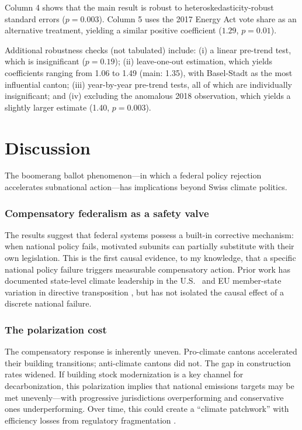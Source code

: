 \documentclass[12pt]{article}
\begin{document}
Column 4 shows that the main result is robust to heteroskedasticity-robust standard errors ($p = 0.003$). Column 5 uses the 2017 Energy Act vote share as an alternative treatment, yielding a similar positive coefficient ($1.29$, $p = 0.01$).

Additional robustness checks (not tabulated) include: (i) a linear pre-trend test, which is insignificant ($p = 0.19$); (ii) leave-one-out estimation, which yields coefficients ranging from 1.06 to 1.49 (main: 1.35), with Basel-Stadt as the most influential canton; (iii) year-by-year pre-trend tests, all of which are individually insignificant; and (iv) excluding the anomalous 2018 observation, which yields a slightly larger estimate (1.40, $p = 0.003$).



\section{Discussion}
\label{sec:discussion}

The boomerang ballot phenomenon---in which a federal policy rejection accelerates subnational action---has implications beyond Swiss climate politics.

\subsubsection*{Compensatory federalism as a safety valve} The results suggest that federal systems possess a built-in corrective mechanism: when national policy fails, motivated subunits can partially substitute with their own legislation. This is the first causal evidence, to my knowledge, that a specific national policy failure triggers measurable compensatory action. Prior work has documented state-level climate leadership in the U.S.\ \citep{rabe2004statehouse, goulder2020climate} and EU member-state variation in directive transposition \citep{steunenberg2006turning}, but has not isolated the causal effect of a discrete national failure.

\subsubsection*{The polarization cost} The compensatory response is inherently uneven. Pro-climate cantons accelerated their building transitions; anti-climate cantons did not. The gap in construction rates widened. If building stock modernization is a key channel for decarbonization, this polarization implies that national emissions targets may be met unevenly---with progressive jurisdictions overperforming and conservative ones underperforming. Over time, this could create a ``climate patchwork'' with efficiency losses from regulatory fragmentation \citep{fell2012regulation}.
\end{document}
